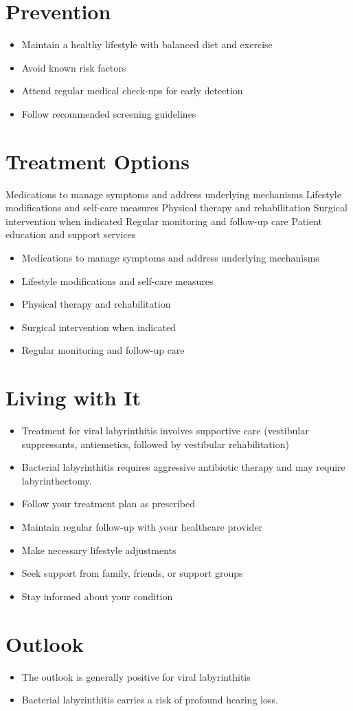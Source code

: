 \section{Prevention}
\begin{itemize}[noitemsep]
  \item Maintain a healthy lifestyle with balanced diet and exercise
  \item Avoid known risk factors
  \item Attend regular medical check-ups for early detection
  \item Follow recommended screening guidelines
\end{itemize}
\section{Treatment Options}
Medications to manage symptoms and address underlying mechanisms Lifestyle modifications and self-care measures Physical therapy and rehabilitation Surgical intervention when indicated Regular monitoring and follow-up care Patient education and support services

\begin{itemize}[noitemsep]
  \item Medications to manage symptoms and address underlying mechanisms
  \item Lifestyle modifications and self-care measures
  \item Physical therapy and rehabilitation
  \item Surgical intervention when indicated
  \item Regular monitoring and follow-up care
\end{itemize}
\section{Living with It}
\begin{itemize}[noitemsep]
  \item Treatment for viral labyrinthitis involves supportive care (vestibular suppressants, antiemetics, followed by vestibular rehabilitation)
  \item Bacterial labyrinthitis requires aggressive antibiotic therapy and may require labyrinthectomy.
  \item Follow your treatment plan as prescribed
  \item Maintain regular follow-up with your healthcare provider
  \item Make necessary lifestyle adjustments
  \item Seek support from family, friends, or support groups
  \item Stay informed about your condition
\end{itemize}
\section{Outlook}
\begin{itemize}[noitemsep]
  \item The outlook is generally positive for viral labyrinthitis
  \item Bacterial labyrinthitis carries a risk of profound hearing loss.
\end{itemize}
